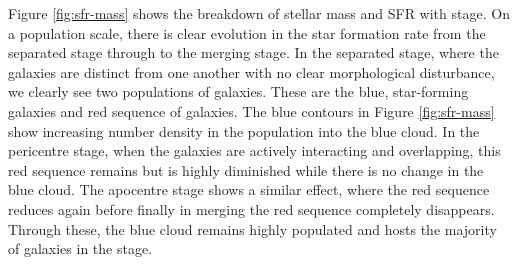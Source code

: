 Figure \ref{fig:sfr-mass} shows the breakdown of stellar mass and SFR with stage. On a population scale, there is clear evolution in the star formation rate from the separated stage through to the merging stage. In the separated stage, where the galaxies are distinct from one another with no clear morphological disturbance, we clearly see two populations of galaxies. These are the blue, star-forming galaxies and red sequence of galaxies. The blue contours in Figure \ref{fig:sfr-mass} show increasing number density in the population into the blue cloud. In the pericentre stage, when the galaxies are actively interacting and overlapping, this red sequence remains but is highly diminished while there is no change in the blue cloud. The apocentre stage shows a similar effect, where the red sequence reduces again before finally in merging the red sequence completely disappears. Through these, the blue cloud remains highly populated and hosts the majority of galaxies in the stage.

